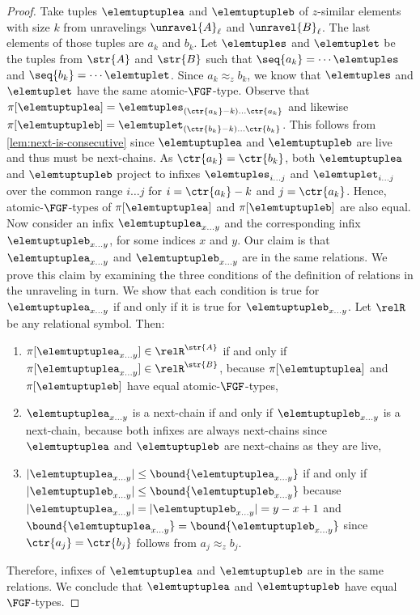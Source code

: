 \begin{proof}
  Take tuples $\elemtuptuplea$ and $\elemtuptupleb$ of $z$-similar elements with size $k$ from unravelings $\unravel{A}_{\ell}$ and $\unravel{B}_{\ell}$.
  The last elements of those tuples are $a_{k}$ and $b_{k}$.
  Let $\elemtuples$ and $\elemtuplet$ be the tuples from $\str{A}$ and $\str{B}$ such that $\seq{a_{k}} = \cdots \elemtuples$ and $\seq{b_{k}} = \cdots \elemtuplet$.
  Since $a_{k} \approx_z b_{k}$, we know that $\elemtuples$ and $\elemtuplet$ have the same atomic-$\FGF$-type.
  Observe that $\pi[\elemtuptuplea] = \elemtuples_{(\ctr{a_{k}}-k)\ldots{}\ctr{a_{k}}}$ and likewise $\pi[\elemtuptupleb] = \elemtuplet_{(\ctr{b_{k}}-k)\ldots{}\ctr{b_{k}}}$.
  This follows from \cref{lem:next-is-consecutive} since $\elemtuptuplea$ and $\elemtuptupleb$ are live and thus must be next-chains.
  As $\ctr{a_{k}} = \ctr{b_{k}}$, both $\elemtuptuplea$ and $\elemtuptupleb$ project to infixes $\elemtuples_{i\ldots{}j}$ and $\elemtuplet_{i\ldots{}j}$ over the common range $i\ldots{}j$ for $i = \ctr{a_{k}} - k$ and $j = \ctr{a_{k}}$.
  Hence, atomic-$\FGF$-types of $\pi[\elemtuptuplea]$ and $\pi[\elemtuptupleb]$ are also equal.
  Now consider an infix $\elemtuptuplea_{x\ldots{}y}$ and the corresponding infix $\elemtuptupleb_{x\ldots{}y}$, for some indices $x$ and $y$.
  Our claim is that $\elemtuptuplea_{x\ldots{}y}$ and $\elemtuptupleb_{x\ldots{}y}$ are in the same relations.
  We prove this claim by examining the three conditions of the definition of relations in the unraveling in turn.
  We show that each condition is true for $\elemtuptuplea_{x\ldots{}y}$ if and only if it is true for $\elemtuptupleb_{x\ldots{}y}$.
  Let $\relR$ be any relational symbol. Then:
  \begin{enumerate}
    \item $\pi[\elemtuptuplea_{x\ldots{}y}] \in \relR^{\str{A}}$ if and only if $\pi[\elemtuptuplea_{x\ldots{}y}] \in \relR^{\str{B}}$, because $\pi[\elemtuptuplea]$ and $\pi[\elemtuptupleb]$ have equal atomic-$\FGF$-types,
    \item $\elemtuptuplea_{x\ldots{}y}$ is a next-chain if and only if $\elemtuptupleb_{x\ldots{}y}$ is a next-chain, because both infixes are always next-chains since $\elemtuptuplea$ and $\elemtuptupleb$ are next-chains as they are live,
    \item $|\elemtuptuplea_{x\ldots{}y}| \le \bound{\elemtuptuplea_{x\ldots{}y}}$ if and only if $|\elemtuptupleb_{x\ldots{}y}| \le \bound{\elemtuptupleb_{x\ldots{}y}}$ because $|\elemtuptuplea_{x\ldots{}y}| = |\elemtuptupleb_{x\ldots{}y}| = y-x+1$ and $\bound{\elemtuptuplea_{x\ldots{}y}} = \bound{\elemtuptupleb_{x\ldots{}y}}$ since $\ctr{a_{j}} = \ctr{b_{j}}$ follows from $a_{j} \approx_{z} b_{j}$.
  \end{enumerate}
  Therefore, infixes of $\elemtuptuplea$ and $\elemtuptupleb$ are in the same relations.
  We conclude that $\elemtuptuplea$ and $\elemtuptupleb$ have equal $\FGF$-types.
\end{proof}
